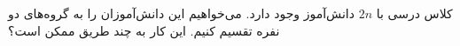 \p
کلاس درسی با
$2n$
دانش‌آموز وجود دارد.
می‌خواهیم این دانش‌آموزان را به گروه‌های دو نفره تقسیم کنیم.
این کار به چند طریق ممکن است؟